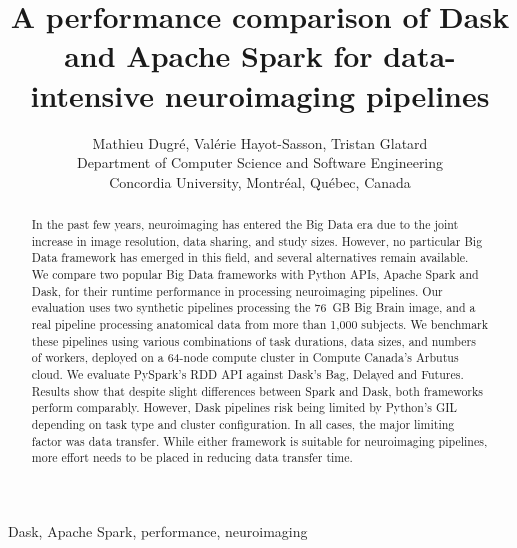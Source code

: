 \documentclass[conference]{IEEEtran}
\begin{document}
\title{A performance comparison of Dask and Apache Spark for data-intensive neuroimaging pipelines}

\author{Mathieu Dugr\'e, Val\'erie Hayot-Sasson, Tristan Glatard\\
Department of Computer Science and Software Engineering\\
Concordia University, Montr\'eal, Qu\'ebec, Canada
}

\maketitle

\begin{abstract}

In the past few years, neuroimaging has entered the Big Data era due to the
joint increase in image resolution, data sharing, and study sizes. However,
no particular Big Data framework has emerged in this field, and several
alternatives remain available. We compare two popular Big Data frameworks
with Python APIs, Apache Spark and Dask, for their runtime performance in
processing neuroimaging pipelines. Our evaluation uses two synthetic
pipelines processing the 76~GB Big Brain image, and a real pipeline
processing anatomical data from more than 1,000 subjects. We benchmark these pipelines using
 various combinations of task durations, data sizes, and numbers of workers,
deployed on a 64-node compute cluster in Compute Canada's Arbutus
cloud. We evaluate PySpark's RDD API against Dask's Bag, Delayed and Futures.
Results show that despite slight differences between Spark and Dask, both
frameworks perform comparably. However, Dask pipelines risk being limited
by Python's GIL depending on task type and cluster configuration. In all
cases, the major limiting factor was data transfer. While either framework
is suitable for neuroimaging pipelines, more effort needs to be placed in
reducing data transfer time.
\end{abstract}

\begin{IEEEkeywords}
Dask, Apache Spark, performance, neuroimaging
\end{IEEEkeywords}
\end{document}
